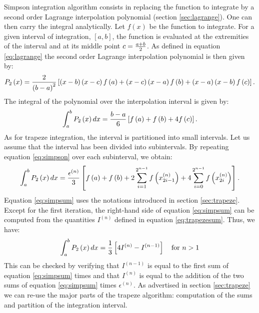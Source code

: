 Simpson integration algorithm consists in replacing the function to integrate by a second order Lagrange interpolation polynomial\cite{Bass} (\cf section
\ref{sec:lagrange}). One can then carry the integral analytically.
Let $f\left(x\right)$ be the function to integrate. For a given
interval of integration, $\left[a,b\right]$, the function is
evaluated at the extremities of the interval and at its middle
point $c={a+b \over 2}$. As defined in equation \ref{eq:lagrange}
the second order Lagrange interpolation polynomial is then given
by:
\begin{equation}
  P_2\left(x\right)={2\over \left(b-a\right)^2}\left[\left(x-b\right)\left(x-c\right)f\left(a\right) +\left(x-c\right)\left(x-a\right)f\left(b\right) +
  \left(x-a\right)\left(x-b\right)f\left(c\right)\right].
\end{equation}
The integral of the polynomial over the interpolation interval is
given by:
\begin{equation}
\label{eq:simpson} \int_a^b P_2\left(x\right)dx={b-a \over
6}\left[f\left(a\right) + f\left(b\right) + 4 f\left(c\right)
\right].
\end{equation}
As for trapeze integration, the interval is partitioned into small
intervals. Let us assume that the interval has been divided into
subintervals. By repeating equation \ref{eq:simpson} over each
subinterval, we obtain:
\begin{equation}
\label{eq:simpsum} \int_a^b
P_2\left(x\right)dx={\epsilon^{\left(n\right)} \over
3}\left[f\left(a\right) + f\left(b\right) + 2 \sum_{i=1}^{2^{n-1}}
f\left(x_{2i-1}^{\left(n\right)}\right) + 4 \sum_{i=0}^{2^{n-1}}
f\left(x_{2i}^{\left(n\right)}\right) \right].
\end{equation}
Equation \ref{eq:simpsum} uses the notations introduced in section
\ref{sec:trapeze}. Except for the first iteration, the right-hand
side of equation \ref{eq:simpsum} can be computed from the
quantities $I^{\left(n\right)}$ defined in equation
\ref{eq:trapezesum}. Thus, we have:
\begin{equation}
  \int_a^b
P_2\left(x\right)dx={1 \over
3}\left[4I^{\left(n\right)}-I^{\left(n-1\right)}\right]
\mbox{\quad for $n>1$}
\end{equation}
This can be checked by verifying that $I^{\left(n-1\right)}$ is
equal to the first sum of equation \ref{eq:simpsum} times  and
that $I^{\left(n\right)}$  is equal to the addition of the two
sums of equation \ref{eq:simpsum} times
$\epsilon^{\left(n\right)}$. As advertised in section
\ref{sec:trapeze} we can re-use the major parts of the trapeze
algorithm: computation of the sums and partition of the
integration interval.

